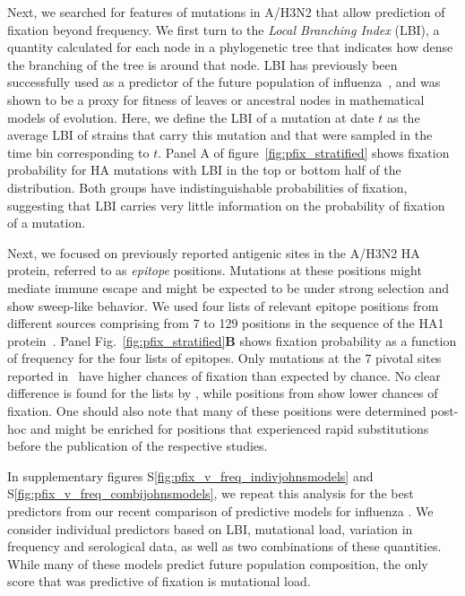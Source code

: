 \documentclass[reprint,amsmath,amssymb,superscriptaddress,showpacs,rmp]{revtex4-1}
\newcommand{\sref}[1]{S\ref{#1}}
\begin{document}
Next, we searched for features of mutations in A/H3N2 that allow prediction of fixation beyond frequency.
We first turn to the \emph{Local Branching Index} (LBI), a quantity calculated for each node in a phylogenetic tree that indicates how dense the branching of the tree is around that node.
LBI has previously been successfully used as a predictor of the future population of influenza~\cite{neher_predicting_2014}, and was shown to be a proxy for fitness of leaves or ancestral nodes in mathematical models of evolution.
Here, we define the LBI of a mutation at date $t$ as the average LBI of strains that carry this mutation and that were sampled in the time bin corresponding to $t$.
Panel A of figure~\ref{fig:pfix_stratified} shows fixation probability for HA mutations with LBI in the top or bottom half of the distribution.
Both groups have indistinguishable probabilities of fixation, suggesting that LBI carries very little information on the probability of fixation of a mutation.

Next, we focused on previously reported antigenic sites in the A/H3N2 HA protein, referred to as \emph{epitope} positions.
Mutations at these positions might mediate immune escape and might be expected to be under strong selection and show sweep-like behavior.
We used four lists of relevant epitope positions from different sources comprising from 7 to 129 positions in the sequence of the HA1 protein~\cite{Koel976, luksza_predictive_2014, Shih6283, wolf_long_2006}.
Panel Fig.~\ref{fig:pfix_stratified}\textbf{B} shows fixation probability as a function of frequency for the four lists of epitopes.
Only mutations at the 7 pivotal sites reported in~\cite{Koel976} have higher chances of fixation than expected by chance.
No clear difference is found for the lists by \citet{luksza_predictive_2014, wolf_long_2006}, while positions from \citet{Shih6283} show lower chances of fixation.
One should also note that many of these positions were determined post-hoc and might be enriched for positions that experienced rapid substitutions before the publication of the respective studies.

In supplementary figures \sref{fig:pfix_v_freq_indivjohnsmodels} and \sref{fig:pfix_v_freq_combijohnsmodels}, we repeat this analysis for the best predictors from our recent comparison of predictive models for influenza \citep{huddleston_integrating_2020}.
We consider individual predictors based on LBI, mutational load, variation in frequency and serological data, as well as two combinations of these quantities.
While many of these models predict future population composition, the only score that was predictive of fixation is mutational load.
\end{document}
